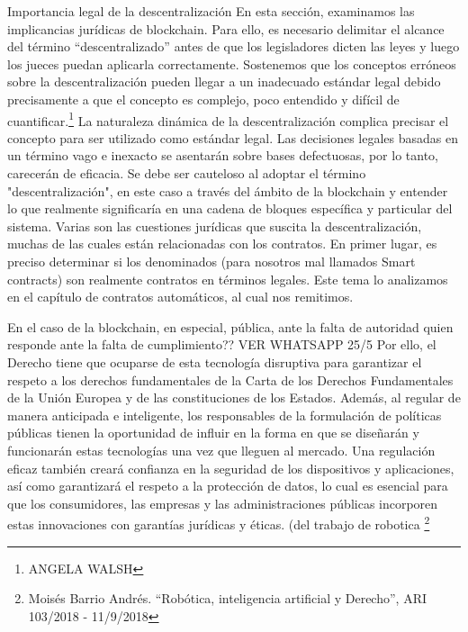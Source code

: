 \documentclass[12pt]{report} %
\begin{document}
  Importancia legal de la descentralización
	En esta sección, examinamos las implicancias jurídicas de blockchain. Para ello, es necesario delimitar el alcance del término “descentralizado” antes de que los legisladores dicten las leyes y luego los jueces puedan aplicarla correctamente. 
	Sostenemos que los conceptos erróneos sobre la descentralización pueden llegar a un inadecuado estándar legal debido precisamente a que el concepto es complejo, poco entendido y difícil de cuantificar.\footnote{ANGELA WALSH } 
	La naturaleza dinámica de la descentralización complica precisar el concepto para ser utilizado como estándar legal. Las decisiones legales basadas en un término vago e inexacto se asentarán sobre bases defectuosas, por lo tanto, carecerán de eficacia.
	Se debe ser cauteloso al adoptar el término "descentralización", en este caso a través del ámbito de la blockchain y entender lo que realmente significaría en una cadena de bloques específica y particular del sistema.
	Varias son las cuestiones jurídicas que suscita la descentralización, muchas de las cuales están relacionadas con los contratos. En primer lugar, es preciso determinar si los denominados (para nosotros mal llamados Smart contracts) son realmente contratos en términos legales. Este tema lo analizamos en el capítulo de contratos automáticos, al cual nos remitimos.

En el caso de la blockchain, en especial, pública, ante la falta de autoridad quien responde ante la falta de cumplimiento?? VER WHATSAPP 25/5
Por ello, el Derecho tiene que ocuparse de esta tecnología disruptiva para garantizar el respeto a los derechos fundamentales de la Carta de los Derechos Fundamentales de la Unión Europea y de las constituciones de los Estados. Además, al regular de manera anticipada e inteligente, los responsables de la formulación de políticas públicas tienen la oportunidad de influir en la forma en que se diseñarán y funcionarán estas tecnologías una vez que lleguen al mercado. Una regulación eficaz también creará confianza en la seguridad de los dispositivos y aplicaciones, así como garantizará el respeto a la protección de datos, lo cual es esencial para que los consumidores, las empresas y las administraciones públicas incorporen estas innovaciones con garantías jurídicas y éticas. (del trabajo de robotica \footnote{Moisés Barrio Andrés. “Robótica, inteligencia artificial y Derecho”, ARI 103/2018 - 11/9/2018} 
\end{document}
